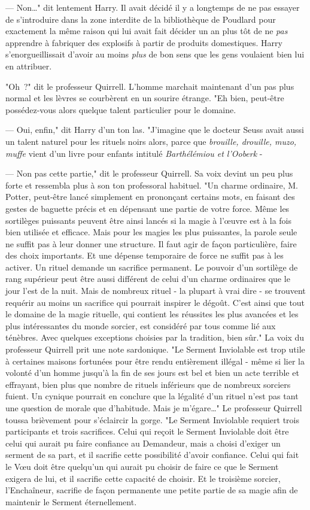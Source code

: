--- Non…" dit lentement Harry. Il avait décidé il y a longtemps de ne pas essayer de s'introduire dans la zone interdite de la bibliothèque de Poudlard pour exactement la même raison qui lui avait fait décider un an plus tôt de ne \emph{pas} apprendre à fabriquer des explosifs à partir de produits domestiques. Harry s'enorgueillissait d'avoir au moins \emph{plus} de bon sens que les gens voulaient bien lui en attribuer.

"Oh~?" dit le professeur Quirrell. L'homme marchait maintenant d'un pas plus normal et les lèvres se courbèrent en un sourire étrange. "Eh bien, peut-être possédez-vous alors quelque talent particulier pour le domaine.

--- Oui, enfin," dit Harry d'un ton las. "J'imagine que le docteur Seuss avait aussi un talent naturel pour les rituels noirs alors, parce que \emph{brouille, drouille, muzo, muffe} vient d'un livre pour enfants intitulé \emph{Barthélémiou et l'Ooberk} -

--- Non pas cette partie," dit le professeur Quirrell. Sa voix devint un peu plus forte et ressembla plus à son ton professoral habituel. "Un charme ordinaire, M. Potter, peut-être lancé simplement en prononçant certains mots, en faisant des gestes de baguette précis et en dépensant une partie de votre force. Même les sortilèges puissants peuvent être ainsi lancés si la magie à l'œuvre est à la fois bien utilisée et efficace. Mais pour les magies les plus puissantes, la parole seule ne suffit pas à leur donner une structure. Il faut agir de façon particulière, faire des choix importants. Et une dépense temporaire de force ne suffit pas à les activer. Un rituel demande un sacrifice permanent. Le pouvoir d'un sortilège de rang supérieur peut être aussi différent de celui d'un charme ordinaires que le jour l'est de la nuit. Mais de nombreux rituel - la plupart à vrai dire - se trouvent requérir au moins un sacrifice qui pourrait inspirer le dégoût. C'est ainsi que tout le domaine de la magie rituelle, qui contient les réussites les plus avancées et les plus intéressantes du monde sorcier, est considéré par tous comme lié aux ténèbres. Avec quelques exceptions choisies par la tradition, bien sûr." La voix du professeur Quirrell prit une note sardonique. "Le Serment Inviolable est trop utile à certaines maisons fortunées pour être rendu entièrement illégal - même si lier la volonté d'un homme jusqu'à la fin de ses jours est bel et bien un acte terrible et effrayant, bien plus que nombre de rituels inférieurs que de nombreux sorciers fuient. Un cynique pourrait en conclure que la légalité d'un rituel n'est pas tant une question de morale que d'habitude. Mais je m'égare…" Le professeur Quirrell toussa brièvement pour s'éclaircir la gorge. "Le Serment Inviolable requiert trois participants et trois sacrifices. Celui qui reçoit le Serment Inviolable doit être celui qui aurait pu faire confiance au Demandeur, mais a choisi d'exiger un serment de sa part, et il sacrifie cette possibilité d'avoir confiance. Celui qui fait le Vœu doit être quelqu'un qui aurait pu choisir de faire ce que le Serment exigera de lui, et il sacrifie cette capacité de choisir. Et le troisième sorcier, l'Enchaîneur, sacrifie de façon permanente une petite partie de sa magie afin de maintenir le Serment éternellement.

